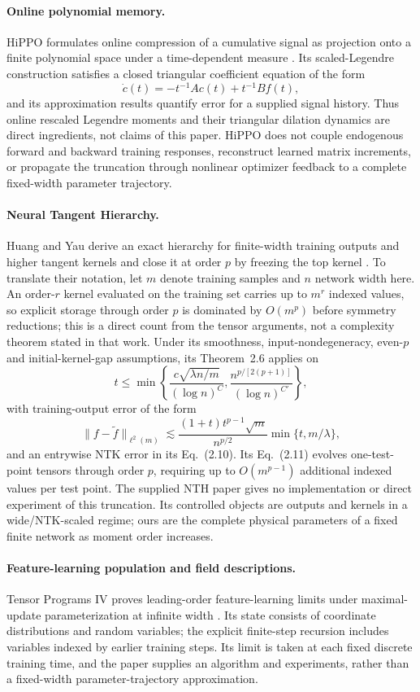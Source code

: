\documentclass[11pt]{article}
\theoremstyle{definition}
\theoremstyle{remark}
\begin{document}
\paragraph{Online polynomial memory.}
HiPPO formulates online compression of a cumulative signal as projection onto a
finite polynomial space under a time-dependent measure
\citep{gu2020hippo}.  Its scaled-Legendre construction satisfies a closed
triangular coefficient equation of the form
\[
 \dot c(t)=-t^{-1}Ac(t)+t^{-1}Bf(t),
\]
and its approximation results quantify error for a supplied signal history.
Thus online rescaled Legendre moments and their triangular dilation dynamics are
direct ingredients, not claims of this paper.  HiPPO does not couple endogenous
forward and backward training responses, reconstruct learned matrix increments,
or propagate the truncation through nonlinear optimizer feedback to a complete
fixed-width parameter trajectory.

\paragraph{Neural Tangent Hierarchy.}
Huang and Yau derive an exact hierarchy for finite-width training outputs and
higher tangent kernels and close it at order $p$ by freezing the top kernel
\citep{huang2020nth}.  To translate their notation, let $m$ denote training
samples and $n$ network width here.  An order-$r$ kernel evaluated on the
training set carries up to $m^r$ indexed values, so explicit storage through
order $p$ is dominated by $O(m^p)$ before symmetry reductions; this is a direct
count from the tensor arguments, not a complexity theorem stated in that work.
Under its smoothness, input-nondegeneracy, even-$p$ and initial-kernel-gap
assumptions, its Theorem~2.6 applies on
\[
 t\le\min\left\{
 \frac{c\sqrt{\lambda n/m}}{(\log n)^C},
 \frac{n^{p/[2(p+1)]}}{(\log n)^{C'}}
 \right\},
\]
with training-output error of the form
\[
 \|f-\widetilde f\|_{\ell^2(m)}
 \lesssim
 \frac{(1+t)t^{p-1}\sqrt m}{n^{p/2}}
 \min\{t,m/\lambda\},
\]
and an entrywise NTK error in its Eq.~(2.10).  Its Eq.~(2.11) evolves
one-test-point tensors through order $p$, requiring up to $O(m^{p-1})$
additional indexed values per test point.  The supplied NTH paper gives no
implementation or direct experiment of this truncation.  Its controlled objects
are outputs and kernels in a wide/NTK-scaled regime; ours are the complete
physical parameters of a fixed finite network as moment order increases.

\paragraph{Feature-learning population and field descriptions.}
Tensor Programs IV proves leading-order feature-learning limits under
maximal-update parameterization at infinite width
\citep{yang2021tensor}.  Its state consists of coordinate distributions and
random variables; the explicit finite-step recursion includes variables indexed
by earlier training steps.  Its limit is taken at each fixed discrete training
time, and the paper supplies an algorithm and experiments, rather than a
fixed-width parameter-trajectory approximation.
\end{document}
